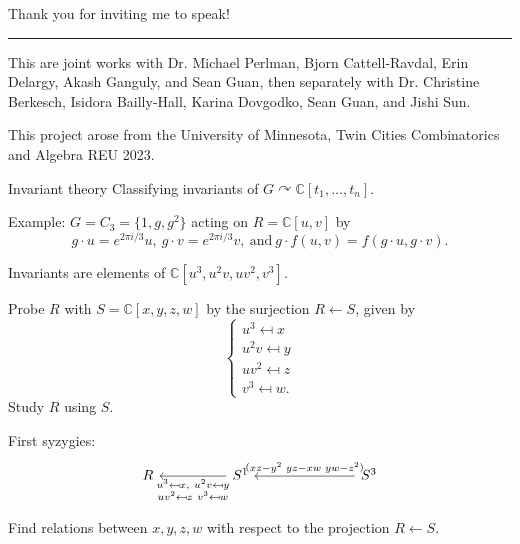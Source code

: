 \documentclass[mathserif
, handout
]{beamer}
\title
{\color{black!85}{Free and Virtual Resolutions}}
\subtitle{Undergraduate Mathematics Research Symposium 2024}
\author[Sai Sivakumar]
{Sai Sivakumar}
\institute[Georgia Tech]{\color{blue!40!palettelight}{University of Florida}}
\date{26 April 2024}
\begin{document}
\frame{\titlepage}

\begin{frame}{}{}
{\color{blue!40!palettelight}Thank you for inviting me to speak!}
\vspace{0.75pc}
\hrule
\vspace{0.75pc}
This are joint works with Dr. Michael Perlman, Bjorn Cattell-Ravdal, Erin Delargy, Akash Ganguly, and Sean Guan,
then separately with Dr. Christine Berkesch, Isidora Bailly-Hall, Karina Dovgodko, Sean Guan, and Jishi Sun.

\vspace{0.75pc}
This project arose from the University of Minnesota, Twin Cities Combinatorics and Algebra REU 2023. 
\end{frame}

\begin{frame}{Invariant theory}
    Classifying invariants of $G\curvearrowright \mathbb C[t_1,\dots,t_n]$.

    Example: $G = C_3 = \{1,g,g^2\}$ acting on $R = \mathbb C[u,v]$ by \[g\cdot u = e^{2\pi i /3}u,~ g\cdot v = e^{2\pi i /3}v,~ \text{and} ~ g\cdot f(u,v) = f(g\cdot u,g\cdot v).\]
    
    Invariants are elements of $\mathbb C[u^3,u^2v,uv^2,v^3]$.
\end{frame}

\begin{frame}
    Probe $R$ with $S = \mathbb C[x,y,z,w]$ by the surjection $R\leftarrow S$, given by
    \[\begin{cases}
        u^3 \mapsfrom x \\
        u^2v \mapsfrom y \\
        uv^2 \mapsfrom z \\
        v^3 \mapsfrom w .
    \end{cases}\]
    Study $R$ using $S$.
\end{frame}

\begin{frame}
    First syzygies:
\[\begin{tikzcd}[ampersand replacement=\&]
	R \&\& {S^1} \&\&\& {S^3}
	\arrow["{\substack{u^3 \mapsfrom x, ~u^2v \mapsfrom y\\ uv^2 \mapsfrom z ~v^3 \mapsfrom w}}", from=1-3, to=1-1]
	\arrow["{(\!\begin{smallmatrix}xz-y^2 & yz-xw & yw-z^2\end{smallmatrix}\!)}"', from=1-6, to=1-3]
\end{tikzcd}\]

Find relations between $x,y,z,w$ with respect to the projection $R\leftarrow S$.
\end{frame}
\end{document}
